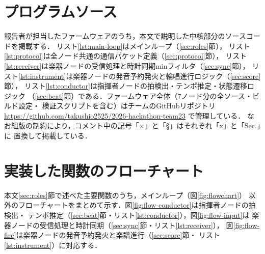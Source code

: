 \documentclass[uplatex,dvipdfmx]{jlreq}
\begin{document}
\appendix
\renewcommand{\thefigure}{A.\arabic{figure}} %
\renewcommand{\thetable}{A.\arabic{table}}   %
\renewcommand{\theequation}{\Alph{section}.\arabic{equation}} %

\section{プログラムソース}\label{sec:appendix-src}

報告者が担当したファームウェアのうち，本文で説明した中核部分のソースコードを掲載する．
リスト\ref{lst:main-loop}はメインループ（\ref{sec:roles}節），
リスト\ref{lst:protocol}は全ノード共通の通信パケット定義（\ref{sec:protocol}節），
リスト\ref{lst:receiver}は楽器ノードの受信処理と時計同期minフィルタ（\ref{sec:sync}節），
リスト\ref{lst:instrument}は楽器ノードの発音予約発火と輪唱進行ロジック（\ref{sec:score}節），
リスト\ref{lst:conductor}は指揮者ノードの拍検出・テンポ推定・状態遷移ロジック
（\ref{sec:beat}節）である．ファームウェア全体（7ノード分の全ソース・ビルド設定・
検証スクリプトを含む）はチームのGitHubリポジトリ
\url{https://github.com/takushio2525/2026-hackathon-team23} で管理している．
なお組版の制約により，コメント中の記号「×」と「§」はそれぞれ「x」と「Sec.」に
置換して掲載している．











\section{実装した関数のフローチャート}\label{sec:appendix-flow}

本文\ref{sec:roles}節で述べた主要関数のうち，メインループ（図\ref{fig:flowchart}）
以外のフローチャートをまとめて示す．図\ref{fig:flow-conductor}は指揮者ノードの拍検出・
テンポ推定（\ref{sec:beat}節・リスト\ref{lst:conductor}），図\ref{fig:flow-input}は
楽器ノードの受信処理と時計同期（\ref{sec:sync}節・リスト\ref{lst:receiver}），
図\ref{fig:flow-fire}は楽器ノードの発音予約発火と楽譜進行（\ref{sec:score}節・
リスト\ref{lst:instrument}）に対応する．
\end{document}
